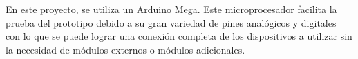 En este proyecto, se utiliza un Arduino Mega. Este microprocesador facilita la prueba del prototipo debido a su gran variedad de pines analógicos y digitales con lo que se puede lograr una conexión completa de los dispositivos a utilizar sin la necesidad de módulos externos o módulos adicionales.



    
